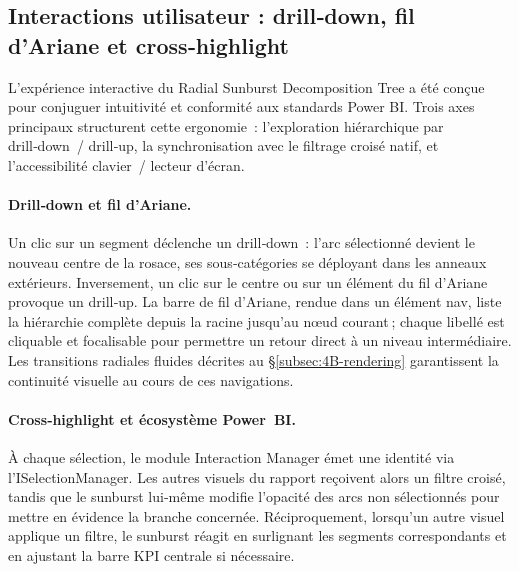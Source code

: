 \subsection{Interactions utilisateur : drill‑down, fil d'Ariane et cross‑highlight}
\label{subsec:4B-interactions}

\setlength{\parindent}{0pt}

L’expérience interactive du Radial Sunburst Decomposition Tree  a été conçue pour conjuguer intuitivité et conformité aux standards Power BI. Trois axes principaux structurent cette ergonomie : l’exploration hiérarchique par drill‑down / drill‑up, la synchronisation avec le filtrage croisé natif, et l’accessibilité clavier / lecteur d’écran.

\paragraph{Drill‑down et fil d'Ariane.} Un clic sur un segment déclenche un drill‑down : l’arc sélectionné devient le nouveau centre de la rosace, ses sous‑catégories se déployant dans les anneaux extérieurs. Inversement, un clic sur le centre ou sur un élément du fil d’Ariane provoque un drill‑up. La barre de fil d'Ariane, rendue dans un élément nav, liste la hiérarchie complète depuis la racine jusqu’au nœud courant ; chaque libellé est cliquable et focalisable pour permettre un retour direct à un niveau intermédiaire. Les transitions radiales fluides décrites au \S\ref{subsec:4B-rendering} garantissent la continuité visuelle au cours de ces navigations.

\paragraph{Cross‑highlight et écosystème Power BI.} À chaque sélection, le module Interaction Manager émet une identité via l’ISelectionManager. Les autres visuels du rapport reçoivent alors un filtre croisé, tandis que le sunburst lui‑même modifie l’opacité des arcs non sélectionnés pour mettre en évidence la branche concernée. Réciproquement, lorsqu’un autre visuel applique un filtre, le sunburst réagit en surlignant les segments correspondants et en ajustant la barre KPI centrale si nécessaire.

